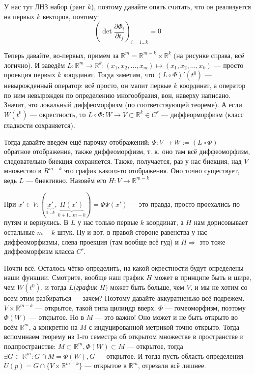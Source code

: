 \documentclass{article}
\begin{document}
У нас тут ЛНЗ набор (ранг $k$), поэтому давайте опять считать, что он реализуется на первых $k$ векторов, поэтому: 
\[\left(\det \frac{\partial \Phi_i}{\partial t_j}\right)_{i = 1 \ldots k} = 0\]

Теперь давайте, во-первых, примем за $\mathbb{R}^m = \mathbb{R}^{m - k} \times \mathbb{R}^k$ (на рисунке справа, всё логично). И заведём $L: \mathbb{R}^m \rightarrow \mathbb{R}^k: (x_1, x_2, \ldots, x_m) \mapsto (x_1, x_2, \ldots, x_k)$ --- просто проекция первых $k$ координат. Тогда заметим, что $(L \circ \Phi)'(t^0)$ --- невырожденный оператор: всё просто, он мапит первые $k$ координат, а оператор по ним невырожден по определению многообразия, вон, наверху написано. Значит, это локальный диффеоморфизм (по соответствующей теореме). А если $W(t^0)$ --- окрестность, то $L \circ \Phi: W \rightarrow V \subset \mathbb{R}^k \in C^r$ --- диффеорморфизм (класс гладкости сохраняется).

Тогда давайте введём ещё парочку отображений: $\Psi: V \rightarrow W := (L \circ \Phi)$ --- обратное отображение, также диффеоморфизм, т. к. оно там всё диффеоморфизм, следовательно биекция сохраняется. Также, получается, раз у нас биекция, над $V$ множество в $R^{m - k}$ это график какого-то отображения. Оно точно существует, ведь $L$ --- биективно. Назовём его $H: V \rightarrow \mathbb{R}^{m - k}$

При $x' \in V: (\underbrace{x'}_{1 \ldots k}, \underbrace{H(x')}_{k + 1 \ldots m - k}) = \Phi\Psi(x')$ --- это правда, просто проехались по путям и вернулись. В $L$ у нас только первые $k$ координат, а $H$ нам дорисовывает остальные $m - k$ штук. Ну и вот, в правой стороне равенства у нас диффеоморфизмы, слева проекция (там вообще всё гуд) и $H \Rightarrow$ это тоже диффеоморфизм класса $C^r$. 

Почти всё. Осталось чётко определить, на какой окрестности будут определены наши функции. Смотрите, вообще наш график $H$ может в принципе быть и шире, чем $W(t^0)$, и тогда $L($\textit{график} $H)$ может быть больше, чем $V$, и мы не хотим со всем этим разбираться --- зачем? Поэтому давайте аккуратненько всё подрежем. $V \times \mathbb{R}^{m - k}$ --- открытое, такой типа цилиндр вверх. $\Phi$ --- гомеоморфизм, поэтому $\Phi(W)$ --- открытое. Но в $M$ --- это важно! Оно может и не быть открыто во всём $\mathbb{R}^m$, а конкретно на $M$ с индуцированной метрикой точно открыто. Тогда вспоминаем теорему из 1-го семестра об открытом множестве в пространстве и подпространстве: $M \subset \mathbb{R}^m, \Phi(W) \subset M$ --- открытое, тогда $\exists G \subset \mathbb{R}^m: G \cap M = \Phi(W), G$ --- открытое. И тогда пусть область определения $\widetilde{U}(p) = G \cap \{V \times \mathbb{R}^{m - k}\}$ --- открытое в $\mathbb{R}^m$, отрезали всё лишнее. 
\end{document}
